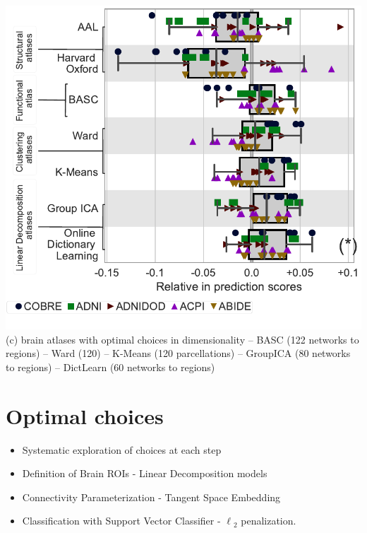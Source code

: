 \documentclass[portrait,a0,final]{a0poster} %
\begin{document}
\begin{minipage}{0.98\linewidth}
\begin{minipage}[t]{0.48\linewidth}
\begin{minipage}[t]{0.98\textwidth}
\begin{center}
\includegraphics[width=0.8\linewidth]{figures/impact_plot_atlas.pdf}\\
\normalsize (c) brain atlases with optimal choices in dimensionality
-- BASC (122 networks to regions) -- Ward (120) --
K-Means (120 parcellations) --
GroupICA (80 networks to regions) -- DictLearn (60 networks to regions)
\end{center}
\end{minipage}

\section{Optimal choices}
\begin{itemize}
    \item Systematic exploration of choices at each step
    \item Definition of Brain ROIs - Linear Decomposition models
    \item Connectivity Parameterization - Tangent Space Embedding
    \item Classification with Support Vector Classifier - $\ell{_2}$
        penalization.
\end{itemize}


\end{minipage}
\end{minipage}
\end{document}

